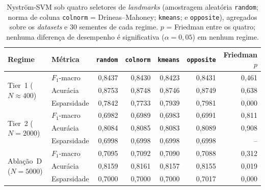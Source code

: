 \begin{table}[ht]
  \centering
  \caption{Nyström-SVM sob quatro seletores de \emph{landmarks} (amostragem aleatória \texttt{random}; norma de coluna \texttt{colnorm} = Drineas--Mahoney; \texttt{kmeans}; e \texttt{opposite}), agregados sobre os \emph{datasets} e 30 sementes de cada regime. $p$ = Friedman entre os quatro; nenhuma diferença de desempenho é significativa ($\alpha=0{,}05$) em nenhum regime.}
  \label{tab:app_selection_regimes}
  \begin{tabular}{llrrrrr}
    \toprule
    Regime & Métrica & \texttt{random} & \texttt{colnorm} & \texttt{kmeans} & \texttt{opposite} & Friedman $p$ \\
    \midrule
    \multirow{3}{*}{Tier~1 ($N{\approx}400$)} & $F_1$-macro & 0,8437 & 0,8430 & 0,8423 & 0,8431 & 0,461 \\
     & Acurácia & 0,8753 & 0,8748 & 0,8746 & 0,8749 & 0,638 \\
     & Esparsidade & 0,7842 & 0,7733 & 0,7939 & 0,7981 & 0,000 \\
    \midrule
    \multirow{3}{*}{Tier~2 ($N{=}2000$)} & $F_1$-macro & 0,6982 & 0,6989 & 0,6983 & 0,6991 & 0,811 \\
     & Acurácia & 0,8084 & 0,8085 & 0,8083 & 0,8089 & 0,908 \\
     & Esparsidade & 0,6998 & 0,6998 & 0,6998 & 0,6998 & -- \\
    \midrule
    \multirow{3}{*}{Ablação~D ($N{=}5000$)} & $F_1$-macro & 0,7095 & 0,7092 & 0,7090 & 0,7088 & 0,312 \\
     & Acurácia & 0,8159 & 0,8161 & 0,8157 & 0,8155 & 0,019 \\
     & Esparsidade & 0,7000 & 0,7000 & 0,7000 & 0,7017 & 0,000 \\
    \bottomrule
  \end{tabular}
\end{table}
